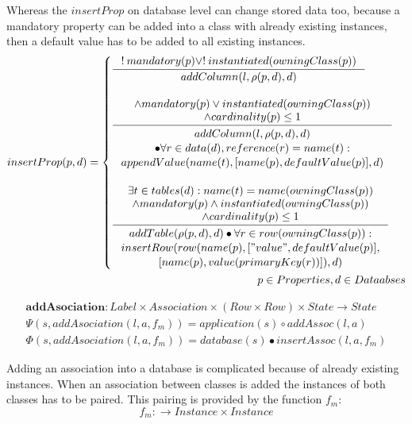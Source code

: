 \documentclass[11pt]{article}
\begin{document}
Whereas the $insertProp$ on database level can change stored data too, because a mandatory property can be added into a class with already existing instances, then a default value has to be added to all existing instances.
\begin{align*}
insertProp(p, d) = \begin{cases}
\inference{!\:mandatory(p) \vee !\:instantiated(owningClass(p))}{addColumn(l, \rho(p,d), d)} 
\\ \\ 
\inference{ \wedge mandatory(p) \vee instantiated(owningClass(p)) \\ \wedge cardinality(p) \leq 1}{\begin{gathered} addColumn(l, \rho(p,d), d) \\ \bullet \forall r \in data(d), reference(r) = name(t) : \\ appendValue(name(t), [name(p), defaultValue(p)], d)
\end{gathered}
} 
\\ \\
\inference{ \exists t \in tables(d) : name(t) = name(owningClass(p)) \\ \wedge mandatory(p) \wedge instantiated(owningClass(p)) \\ \wedge cardinality(p) \leq 1}{\begin{gathered}
addTable(\rho(p,d), d) \bullet \forall r \in row(owningClass(p)) :\\ insertRow(row(name(p), ["value", defaultValue(p)], \\ [name(p), value(primaryKey(r))]),d) 
\end{gathered}
} 
\end{cases}\\
p \in Properties, d \in Dataabses
\end{align*}

\begin{align*}
\mathbf{addAsociation} : Label \times Association \times (Row \times Row) \times State \rightarrow State \\
\Psi(s, addAsociation(l, a, f_m)) = application(s) \circ addAssoc(l, a) \\
\Phi(s, addAsociation(l, a, f_m)) = database(s) \bullet insertAssoc(l, a, f_m)
\end{align*}

Adding an association into a database is complicated because of already existing instances. When an association between classes is added the instances of both classes has to be paired. This pairing is provided by the function $f_m$:
$$f_m : \rightarrow Instance \times Instance $$
\end{document}

